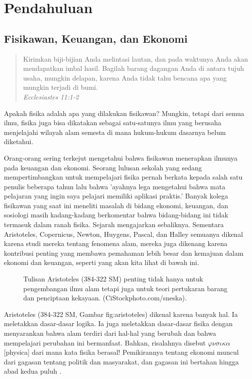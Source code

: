 \documentclass[a4paper,12pt]{book}
\begin{document}
\chapter{Pendahuluan}

\section{Fisikawan, Keuangan, dan Ekonomi}
\label{sec:1.1}

\begin{quote}
Kirimkan biji-bijian Anda melintasi lautan, dan pada waktunya Anda akan mendapatkan imbal hasil. Bagilah barang dagangan Anda di antara tujuh usaha, mungkin delapan, karena Anda tidak tahu bencana apa yang mungkin terjadi di bumi. \\
\textit{Ecclesiastes 11:1-2}
\end{quote}

Apakah fisika adalah apa yang dilakukan fisikawan? Mungkin, tetapi dari semua ilmu, fisika juga bisa dikatakan sebagai satu-satunya ilmu yang berusaha menjelajahi wilayah alam semesta di mana hukum-hukum dasarnya belum diketahui.

Orang-orang sering terkejut mengetahui bahwa fisikawan menerapkan ilmunya pada keuangan dan ekonomi. Seorang lulusan sekolah yang sedang mempertimbangkan untuk mempelajari fisika pernah berkata kepada salah satu penulis beberapa tahun lalu bahwa 'ayahnya lega mengetahui bahwa mata pelajaran yang ingin saya pelajari memiliki aplikasi praktis.' Banyak kolega fisikawan yang saat ini meneliti masalah di bidang ekonomi, keuangan, dan sosiologi masih kadang-kadang berkomentar bahwa bidang-bidang ini tidak termasuk dalam ranah fisika. Sejarah mengajarkan sebaliknya. Sementara Aristoteles, Copernicus, Newton, Huygens, Pascal, dan Halley semuanya dikenal karena studi mereka tentang fenomena alam, mereka juga dikenang karena kontribusi penting yang membawa pemahaman lebih besar dan kemajuan dalam ekonomi dan keuangan, seperti yang akan kita lihat di bawah ini.

\begin{figure}[h]
\centering
\caption{Tulisan Aristoteles (384-322 SM) penting tidak hanya untuk pengembangan ilmu alam tetapi juga untuk teori pertukaran barang dan penciptaan kekayaan. (CiStockphoto.com/sneska).}
\label{fig:aristoteles}
\end{figure}

Aristoteles (384-322 SM, Gambar  {fig:aristoteles}) dikenal karena banyak hal. Ia meletakkan dasar-dasar logika. Ia juga meletakkan dasar-dasar fisika dengan menyarankan bahwa alam terdiri dari hal-hal yang berubah dan bahwa mempelajari perubahan ini bermanfaat. Bahkan, risalahnya disebut $\varphi \nu \sigma \iota \kappa \alpha$ [physica] dari mana kata fisika berasal! Pemikirannya tentang ekonomi muncul dari gagasan tentang politik dan masyarakat, dan gagasan ini bertahan hingga abad kedua puluh \cite{schumpeter1954}.
\end{document}

